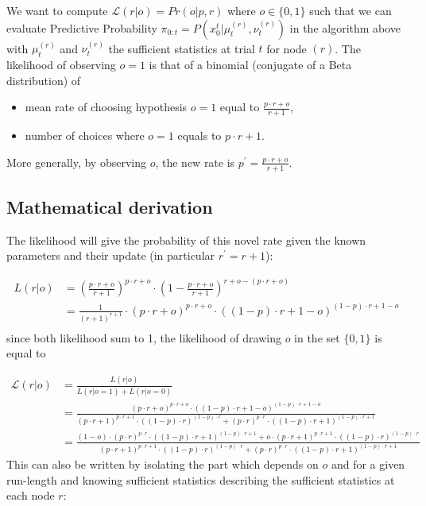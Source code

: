 \documentclass[10pt,letterpaper]{article}
\newcommand{\eqs}[1]{\begin{align*}#1\end{align*}}
\newcommand{\Ll}{\mathcal{L}}
\newcommand{\AM}[1]{\textbf{\textcolor{blue}{[AM: #1]}}}
\begin{document}
We want to compute $\Ll(r | o) = Pr(o | p, r)$ where $o \in \{ 0, 1 \}$ such that we can evaluate Predictive Probability $\pi_{0:t} = P(x_0^t  |\mu^{(r)}_t,\nu^{(r)}_t)$ in the algorithm above with $\mu^{(r)}_t$ and $\nu^{(r)}_t$ the sufficient statistics at trial $t$ for node $(r)$.
The likelihood of observing $o=1$ is that of a binomial (conjugate of a Beta distribution) of
	\begin{itemize}
		\item  mean rate of choosing hypothesis $o=1$ equal to $\frac{p\cdot r + o}{r+1}$,
		\item number of choices where  $o=1$ equals to $p\cdot r+1$.
	\end{itemize}
More generally, by observing $o$, the new rate is $p^{'} = \frac{p\cdot r + o}{r+1}$.

\subsection{Mathematical derivation}

The likelihood will give the probability of this novel rate given the known parameters and their update (in particular $r^{'}=r+1$):

\eqs{
L(r | o)&={(\frac{p\cdot r + o}{r+1})}^{p\cdot r + o} \cdot (1-\frac{p\cdot r + o}{r+1})^{r + o - (p\cdot r + o)} \\
&= \frac{1}{({r+1})^{r+1}} \cdot {(p\cdot r + o)}^{p\cdot r + o}  \cdot {((1- p)\cdot r + 1- o)}^{(1- p)\cdot r + 1- o} \\
}
since both likelihood sum to 1, the likelihood of drawing $o$ in the set $\{ 0, 1 \}$   is equal to

\eqs{
\Ll(r | o)&=\frac{L(r | o)}{L(r | o=1) + L(r | o=0)}  \\
&= \frac{ {(p\cdot r + o)}^{p\cdot r + o}  \cdot {((1- p)\cdot r + 1- o)}^{(1- p)\cdot r + 1- o} }{
 {(p\cdot r + 1)}^{p\cdot r + 1}  \cdot {((1- p)\cdot r )}^{(1- p)\cdot r }  +
  {(p\cdot r )}^{p\cdot r }  \cdot {((1- p)\cdot r + 1)}^{(1- p)\cdot r + 1}
}  \\
&= \frac{ (1-o) \cdot {(p\cdot r)}^{p\cdot r}  \cdot {((1- p)\cdot r + 1)}^{(1- p)\cdot r + 1}
+ o \cdot {(p\cdot r + 1)}^{p\cdot r + 1}  \cdot {((1- p)\cdot r)}^{(1- p)\cdot r}
 }{
 {(p\cdot r + 1)}^{p\cdot r + 1}  \cdot {((1- p)\cdot r )}^{(1- p)\cdot r }  +
  {(p\cdot r )}^{p\cdot r }  \cdot {((1- p)\cdot r + 1)}^{(1- p)\cdot r + 1}
}
}
This can also be written by isolating the part which depends on $o$ and for a given run-length and knowing sufficient statistics describing the sufficient statistics at each node $r$:
\end{document}
